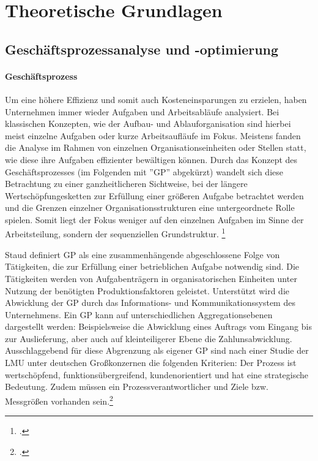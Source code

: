 \chapter{Theoretische Grundlagen}



\section{Geschäftsprozessanalyse und -optimierung}

\subsubsection{Geschäftsprozess}\label{sec:Kapitel211}

Um eine höhere Effizienz und somit auch Kosteneinsparungen  zu erzielen, haben Unternehmen immer wieder Aufgaben und Arbeitsabläufe analysiert. Bei klassischen Konzepten, wie der Aufbau- und Ablauforganisation sind hierbei meist einzelne Aufgaben oder kurze Arbeitsaufläufe im Fokus. Meistens fanden die Analyse im Rahmen von einzelnen Organisationseinheiten oder Stellen statt, wie diese ihre Aufgaben effizienter bewältigen können. Durch das Konzept des Geschäftsprozesses (im Folgenden mit ''GP'' abgekürzt) wandelt sich diese Betrachtung zu einer ganzheitlicheren Sichtweise, bei der längere Wertschöpfungesketten zur Erfüllung einer grö\ss eren Aufgabe betrachtet werden und die Grenzen einzelner Organisationsstrukturen eine untergeordnete Rolle spielen. Somit liegt der Fokus weniger auf den einzelnen Aufgaben im Sinne der Arbeitsteilung, sondern der sequenziellen Grundstruktur. \footcite[Vgl.][S. 5]{theorie_staud_geschäftsprozessanalyse_2006}

Staud definiert GP als eine zusammenhängende abgeschlossene Folge von Tätigkeiten, die zur Erfüllung einer betrieblichen Aufgabe notwendig sind. Die Tätigkeiten werden von Aufgabenträgern in organisatorischen Einheiten unter Nutzung der benötigten Produktionsfaktoren geleistet. Unterstützt wird die Abwicklung der GP durch das Informations- und Kommunikationssystem des Unternehmens. \parencite[Vgl.][S. 9]{theorie_staud_geschäftsprozessanalyse_2006} Ein GP kann auf unterschiedlichen Aggregationsebenen dargestellt werden: Beispielsweise die Abwicklung eines Auftrags vom Eingang bis zur Auslieferung, aber auch auf kleinteiligerer Ebene die Zahlunsabwicklung. Ausschlaggebend für diese Abgrenzung als eigener GP sind nach einer Studie der LMU unter deutschen Gro\ss konzernen die folgenden Kriterien: Der Prozess ist wertschöpfend, funktionsübergreifend, kundenorientiert und hat eine strategische Bedeutung. Zudem müssen ein Prozessverantwortlicher und Ziele bzw. Messgrö\ss en vorhanden sein.\footcite[Vgl.][S. 19]{theorie_koch_studie_kriterien_geschäftsprozess_2003} 

